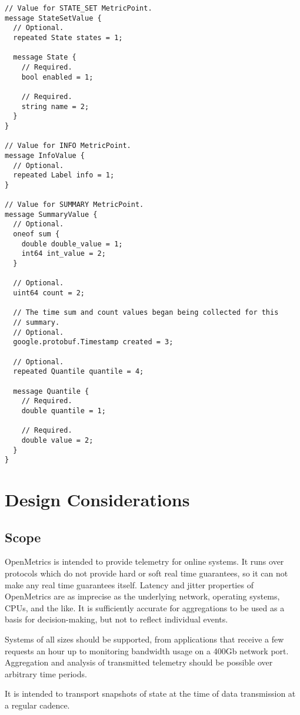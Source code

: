 \documentclass[a4paper,12pt,notitlepage,twoside,openright]{article}
\begin{document}
\begin{verbatim}
// Value for STATE_SET MetricPoint.
message StateSetValue {
  // Optional.
  repeated State states = 1;

  message State {
    // Required.
    bool enabled = 1;

    // Required.
    string name = 2;
  }
}

// Value for INFO MetricPoint.
message InfoValue {
  // Optional.
  repeated Label info = 1;
}

// Value for SUMMARY MetricPoint.
message SummaryValue {
  // Optional.
  oneof sum {
    double double_value = 1;
    int64 int_value = 2;
  }

  // Optional.
  uint64 count = 2;

  // The time sum and count values began being collected for this
  // summary.
  // Optional.
  google.protobuf.Timestamp created = 3;

  // Optional.
  repeated Quantile quantile = 4;

  message Quantile {
    // Required.
    double quantile = 1;

    // Required.
    double value = 2;
  }
}
\end{verbatim}

\hypertarget{design-considerations}{%
\section{Design Considerations}\label{design-considerations}}

\hypertarget{scope}{%
\subsection{Scope}\label{scope}}

OpenMetrics is intended to provide telemetry for online systems. It runs
over protocols which do not provide hard or soft real time guarantees,
so it can not make any real time guarantees itself. Latency and jitter
properties of OpenMetrics are as imprecise as the underlying network,
operating systems, CPUs, and the like. It is sufficiently accurate for
aggregations to be used as a basis for decision-making, but not to
reflect individual events.

Systems of all sizes should be supported, from applications that receive
a few requests an hour up to monitoring bandwidth usage on a 400Gb
network port. Aggregation and analysis of transmitted telemetry should
be possible over arbitrary time periods.

It is intended to transport snapshots of state at the time of data
transmission at a regular cadence.
\end{document}
